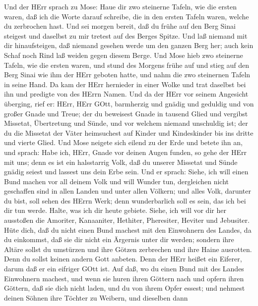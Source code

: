  Und der HErr sprach zu Mose: Haue dir zwo steinerne Tafeln,
wie die ersten waren, daß ich die Worte darauf schreibe, die in den
ersten Tafeln waren, welche du zerbrochen hast.  Und sei
morgen bereit, daß du frühe auf den Berg Sinai steigest und daselbst zu
mir tretest auf des Berges Spitze.  Und laß niemand mit dir
hinaufsteigen, daß niemand gesehen werde um den ganzen Berg her; auch
kein Schaf noch Rind laß weiden gegen diesem Berge.  Und
Mose hieb zwo steinerne Tafeln, wie die ersten waren, und stund des
Morgens frühe auf und stieg auf den Berg Sinai wie ihm der HErr geboten
hatte, und nahm die zwo steinernen Tafeln in seine Hand.  Da
kam der HErr hernieder in einer Wolke und trat daselbst bei ihn und
predigte von des HErrn Namen.  Und da der HErr vor seinem
Angesicht überging, rief er: HErr, HErr GOtt, barmherzig und gnädig und
geduldig und von großer Gnade und Treue;  der du beweisest
Gnade in tausend Glied und vergibst Missetat, Übertretung und Sünde, und
vor welchem niemand unschuldig ist; der du die Missetat der Väter
heimsuchest auf Kinder und Kindeskinder bis ins dritte und vierte Glied.
 Und Mose neigete sich eilend zu der Erde und betete ihn an,
 und sprach: Habe ich, HErr, Gnade vor deinen Augen funden,
so gehe der HErr mit uns; denn es ist ein halsstarrig Volk, daß du
unserer Missetat und Sünde gnädig seiest und lassest uns dein Erbe sein.
 Und er sprach: Siehe, ich will einen Bund machen vor all
deinem Volk und will Wunder tun, dergleichen nicht geschaffen sind in
allen Landen und unter allen Völkern; und alles Volk, darunter du bist,
soll sehen des HErrn Werk; denn wunderbarlich soll es sein, das ich bei
dir tun werde.  Halte, was ich dir heute gebiete. Siehe,
ich will vor dir her ausstoßen die Amoriter, Kanaaniter, Hethiter,
Pheresiter, Heviter und Jebusiter.  Hüte dich, daß du nicht
einen Bund machest mit den Einwohnern des Landes, da du einkommst, daß
sie dir nicht ein Ärgernis unter dir werden;  sondern ihre
Altäre sollst du umstürzen und ihre Götzen zerbrechen und ihre Haine
ausrotten.  Denn du sollst keinen andern Gott anbeten. Denn
der HErr heißet ein Eiferer, darum daß er ein eifriger GOtt ist.
 Auf daß, wo du einen Bund mit des Landes Einwohnern
machest, und wenn sie huren ihren Göttern nach und opfern ihren Göttern,
daß sie dich nicht laden, und du von ihrem Opfer essest; 
und nehmest deinen Söhnen ihre Töchter zu Weibern, und dieselben dann
